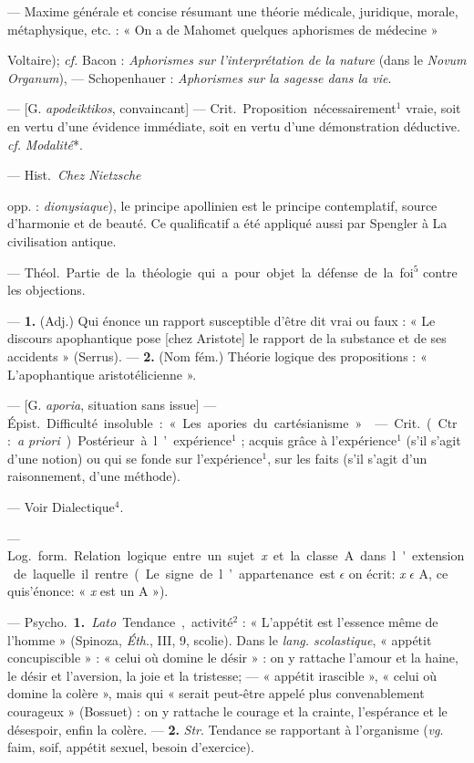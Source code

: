 \begin{itemize}[leftmargin=1cm, label=, itemsep=1pt]
{{ — Maxime générale et
concise résumant une théorie médicale, juridique, morale,
métaphysique, etc. : « On a de Mahomet quelques aphorismes
de médecine » {Voltaire); {\it cf.}  Bacon : {\it Aphorismes sur
l'interprétation de la nature} (dans le
{\it Novum Organum}), — Schopenhauer :
{\it Aphorismes sur la sagesse dans la vie}.

 — [G. {\it apodeiktikos}, convaincant] — \si{Crit.}
Proposition nécessairement$^1$ vraie,
soit en vertu d’une évidence immédiate, soit en vertu d’une
démonstration déductive. {\it cf.}  {\it Modalité}*.

 — \si{Hist.} {\it Chez Nietzsche}
{opp. : {\it dionysiaque}), le principe
apollinien est le principe contemplatif, source d'harmonie et de
beauté. Ce qualificatif a été appliqué
aussi par Spengler à La civilisation
antique.

 — \si{Théol.} Partie de la
théologie qui a pour objet la défense
de la foi$^5$ contre les objections.

 — {\bf 1.} (Adj.) Qui énonce
un rapport susceptible d'être dit vrai
ou faux : « Le discours apophantique
pose [chez Aristote] le rapport de la
substance et de ses accidents » (Serrus). — {\bf 2.} (Nom fém.) Théorie
logique des propositions : « L’apophantique aristotélicienne ».

 — [G. {\it aporia}, situation sans issue]
— \si{Épist.} Difficulté insoluble : « Les
apories du cartésianisme. »

 — \si{Crit.} (Ctr. : {\it a priori}).
Postérieur à l’expérience$^1$ ; acquis
grâce à l'expérience$^1$ (s’il s’agit d'une
notion) ou qui se fonde sur l'expérience$^1$,
sur les faits (s’il s’agit d’un
raisonnement, d’une méthode).

 — Voir Dialectique$^4$.

 — \si{Log.} \si{form.} Relation
logique entre un sujet {\it x} et la
classe A dans l'extension de laquelle
il rentre (Le signe de l’appartenance
est $\epsilon$ on écrit: {\it x} $\epsilon$ A, ce quis’énonce:
« {\it x} est un A »).

— \si{Psycho.} {\bf 1.} {\it Lato}. Tendance,
activité$^2$ : « L'appétit est l'essence
même de l’homme » (Spinoza, {\it Éth}.,
III, 9, scolie). Dans le {\it lang. scolastique}, « appétit concupiscible » :
« celui où domine le désir » : on y
rattache l'amour et la haine, le désir
et l’aversion, la joie et la tristesse; —
« appétit irascible », « celui où domine
la colère », mais qui « serait peut-être
appelé plus convenablement courageux » (Bossuet) : on y rattache le
courage et la crainte, l'espérance et
le désespoir, enfin la colère. — {\bf 2.} {\it Str}.
Tendance se rapportant à l'organisme ({\it vg}. faim, soif, appétit sexuel,
besoin d’exercice).

}}}}
\end{itemize}
